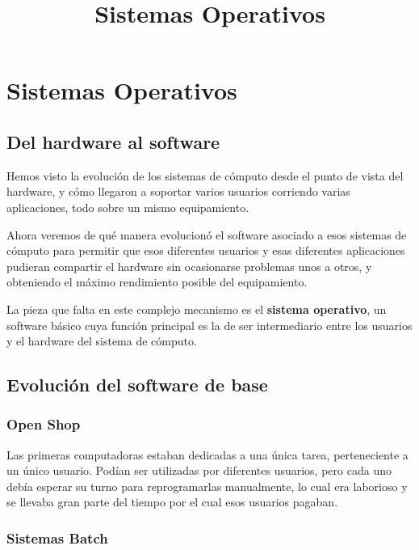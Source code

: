 \documentclass[spanish,A4,]{article}
\title{Sistemas Operativos}
\begin{document}
\maketitle

\section{Sistemas Operativos}\label{sistemas-operativos}

\subsection{Del hardware al software}\label{del-hardware-al-software}

Hemos visto la evolución de los sistemas de cómputo desde el punto de
vista del hardware, y cómo llegaron a soportar varios usuarios corriendo
varias aplicaciones, todo sobre un mismo equipamiento.

Ahora veremos de qué manera evolucionó el software asociado a esos
sistemas de cómputo para permitir que esos diferentes usuarios y esas
diferentes aplicaciones pudieran compartir el hardware sin ocasionarse
problemas unos a otros, y obteniendo el máximo rendimiento posible del
equipamiento.

La pieza que falta en este complejo mecanismo es el \textbf{sistema
operativo}, un software básico cuya función principal es la de ser
intermediario entre los usuarios y el hardware del sistema de cómputo.

\subsection{Evolución del software de
base}\label{evoluciuxf3n-del-software-de-base}

\subsubsection{Open Shop}\label{open-shop}

Las primeras computadoras estaban dedicadas a una única tarea,
perteneciente a un único usuario. Podían ser utilizadas por diferentes
usuarios, pero cada uno debía esperar su turno para reprogramarlas
manualmente, lo cual era laborioso y se llevaba gran parte del tiempo
por el cual esos usuarios pagaban.

\subsubsection{Sistemas Batch}\label{sistemas-batch}
\end{document}
